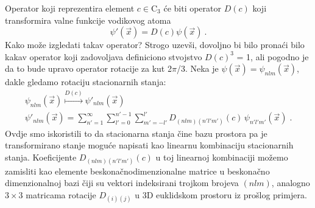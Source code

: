 \begin{primjer}
    \label{ex:C3}
Operator koji reprezentira element $c\in\mathrm{C}_3$ će biti
operator $D(c)$ koji transformira valne funkcije vodikovog atoma
\begin{equation}
\psi'(\vec{x})=D(c)\psi(\vec{x}) \:.
\end{equation}
Kako može izgledati takav operator? Strogo uzevši, dovoljno bi bilo pronaći
bilo kakav
operator koji zadovoljava definiciono stvojstvo $D(c)^3$ = 1, ali
pogodno je da to bude upravo operator rotacije za kut 2$\pi$/3.
Neka je $\psi(\vec{x})=\psi_{nlm}(\vec{x})$, dakle gledamo rotaciju
stacionarnih stanja:
\begin{gather}
\psi_{nlm}(\vec{x}) \stackrel{D(c)}{\mapsto}  \psi'_{nlm}(\vec{x}) \\
   \psi'_{nlm}(\vec{x}) = \sum_{n'=1}^{\infty}\sum_{l'=0}^{n'-1}
  \sum_{m'=-l'}^{l'}  D_{(nlm)(n'l'm')}(c)\,  \psi_{n'l'm'}(\vec{x}) \;. 
  \label{eq:nlmexp}
\end{gather}
Ovdje smo iskoristili to da stacionarna stanja čine bazu prostora pa je
transformirano stanje moguće napisati kao linearnu kombinaciju stacionarnih
stanja. Koeficijente $D_{(nlm)(n'l'm')}(c)$ u toj linearnoj kombinaciji
možemo zamisliti kao elemente beskonačnodimenzionalne matrice u beskonačno
dimenzionalnoj bazi čiji su vektori indeksirani trojkom brojeva $(nlm)$, analogno
$3\times 3$ matricama rotacije $D_{(i)(j)}$ u 3D euklidskom prostoru iz prošlog
primjera.


\end{primjer}

